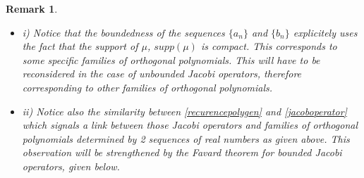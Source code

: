 \documentclass[a4paper,11pt,twoside]{article}
\numberwithin{equation}{section}
\newtheorem{remark}[Theorem]{Remark}
\theoremstyle{nonumberplain}
\begin{document}
\begin{remark} \ \\[-16pt]
\begin{itemize}
\item i) Notice that the boundedness of the sequences $\{a_n\}$ and $\{b_n\}$ explicitely uses the fact that the support of $\mu$, $supp(\mu)$ is compact. This corresponds to some specific families of orthogonal polynomials. This will have to be reconsidered in the case of unbounded Jacobi operators, therefore corresponding to other families of orthogonal polynomials.
\item ii) Notice also the similarity between \eqref{recurencepolygen} and \eqref{jacoboperator} which signals a link between those Jacobi operators and families of orthogonal polynomials determined by 2 sequences of real numbers as given above. This observation will be strengthened by the Favard theorem for bounded Jacobi operators, given below.
\end{itemize}
\end{remark}
\end{document}
